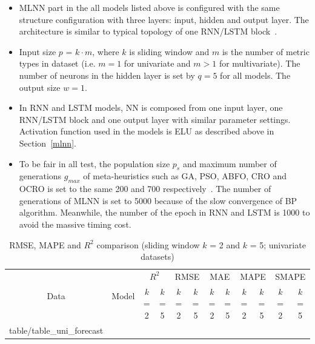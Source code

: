 \documentclass[11pt,twoside]{article}
\makeatletter
\newcommand\primitiveinput[1]
		{\@@input #1 }
\makeatother
\begin{document}
\begin{multicols}{2}
\begin{itemize}
\item MLNN part in the all models listed above is configured with the same structure configuration with three layers: input, hidden and output layer. The architecture is similar to typical topology of one RNN/LSTM block~\citep{ref_xiaolei}. 
\item Input size $p$ = $k \cdot m$, where $k$ is sliding window and $m$ is the number of metric types in dataset (i.e. $m=1$ for univariate and $m>1$ for multivariate). The number of neurons in the hidden layer is set by $q=5$ for all models. The output size $w=1$. 
\item In RNN and LSTM models, NN is composed from one input layer, one RNN/LSTM block and one output layer with similar parameter settings. Activation function used in the models is ELU as described above in Section~\ref{mlnn}.
\item To be fair in all test, the population size $p_s$ and maximum number of generations $g_{max}$ of meta-heuristics such as GA, PSO, ABFO, CRO and OCRO is set to the same 200 and 700 respectively~\citep{ref_thieu}. The number of generations of MLNN is set to 5000 because of the slow convergence of BP algorithm. Meanwhile, the number of the epoch in RNN and LSTM is 1000 to avoid the massive timing cost.
\end{itemize}



\begin{table}[t]
	\caption{RMSE, MAPE and $R^2$ comparison (sliding window $k$ = 2 and $k$ = 5; univariate datasets)}
	\label{table:uni_forecast}
	\centering
	\begin{adjustbox}{height=0.77\textheight, angle=270}
	\begin{sideways}
		\begin{tabular}{| c | c | c | c | c | c | c | c | c | c | c | c |}%
			\hline
			\multirow{2}{*}{Data} & \multirow{2}{*}{Model} & \multicolumn{2}{c|}{$R^2$} & \multicolumn{2}{c|}{RMSE} & \multicolumn{2}{c|}{MAE} & \multicolumn{2}{c|}{MAPE}  & \multicolumn{2}{c|}{SMAPE} \\ \cline{3-12}
   				& & $k$ = 2 & $k$ = 5 & $k$ = 2 & $k$ = 5 & $k$ = 2 & $k$ = 5 & $k$ = 2 & $k$ = 5 & $k$ = 2 & $k$ = 5 \\ [0.5ex] 
			\hline
			\primitiveinput{table/table_uni_forecast}
			\hline
		\end{tabular}
	\end{sideways}
	\end{adjustbox}
\end{table}



\end{multicols}
\end{document}
